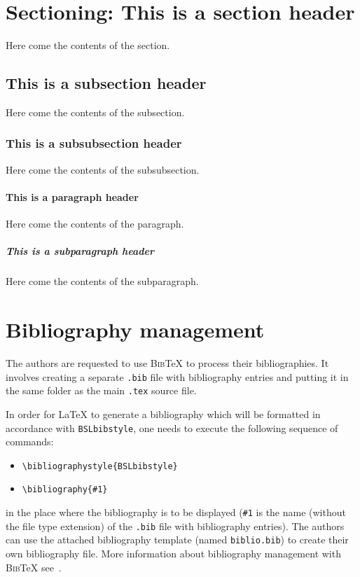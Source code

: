 \documentclass[manuscript]{BSLstyle} %
\begin{document}
\section{Sectioning: This is a section header}

Here come the contents of the section.

\subsection{This is a subsection header}

Here come the contents of the subsection.

\subsubsection{This is a subsubsection header}

Here come the contents of the subsubsection.

\paragraph{This is a paragraph header}

Here come the contents of the paragraph.

\subparagraph{This is a subparagraph header}

Here come the contents of the subparagraph.


\section{Bibliography management}

The authors are requested to use \textsc{Bib}\negthinspace\TeX{} to process their bibliographies. It involves creating a separate \texttt{.bib} file with bibliography entries and putting it in the same folder as the main \texttt{.tex} source file.

In order for \LaTeX{} to generate a bibliography which will be formatted in accordance with \texttt{BSLbibstyle}, one needs to execute the following sequence of commands:
\begin{itemize}
	\item[] \texttt{\textbackslash bibliographystyle\{BSLbibstyle\}}
	\item[] \texttt{\textbackslash bibliography\{\#1\}}
\end{itemize}
in the place where the bibliography is to be displayed (\texttt{\#1} is the name (without the file type extension) of the \texttt{.bib} file with bibliography entries). The authors can use the attached bibliography template (named \texttt{biblio.bib}) to create their own bibliography file. More information about bibliography management with \textsc{Bib}\negthinspace\TeX{} see~\cite{BibTeX}.
\end{document}
